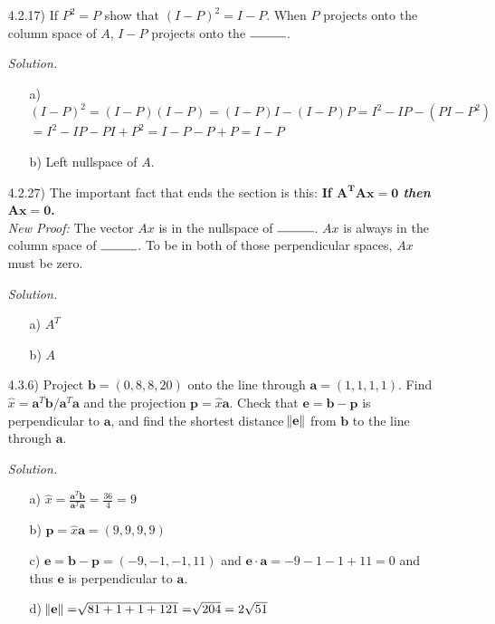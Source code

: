\documentclass[12pt]{article}
\begin{document}
\begin{itemize}
\item[4.2.17)] If $P^2=P$ show that $(I - P)^2=I - P$. When $P$ projects onto the column space of $A$, $I - P$ projects onto the $\rule{1cm}{0.15mm}$.

\textit{Solution.}
\begin{itemize}
\item[a)] $(I-P)^2=(I-P)(I-P)=(I-P)I-(I-P)P=I^2-IP-(PI-P^2)$\\
		  $=I^2-IP-PI+P^2=I-P-P+P=I-P$
\item[b)] Left nullspace of $A$.
\end{itemize}

\item[4.2.27)] The important fact that ends the section is this: \textbf{If $\mathbf{A^TAx=0}$ \textit{then} $\mathbf{Ax=0}$.} \\
\textit{New Proof:} The vector $Ax$ is in the nullspace of $\rule{1cm}{0.15mm}$. $Ax$ is always in the column space of $\rule{1cm}{0.15mm}$. To be in both of those perpendicular spaces, $Ax$ must be zero.

\textit{Solution.}
\begin{itemize}
\item[a)] $A^T$
\item[b)] $A$
\end{itemize}

\item[4.3.6)] Project $\mathbf{b}=(0,8,8,20)$ onto the line through $\mathbf{a}=(1,1,1,1)$. Find $\hat{x}=\mathbf{a}^T\mathbf{b}/\mathbf{a}^T\mathbf{a}$ and the projection $\mathbf{p}=\hat{x}\mathbf{a}$. Check that $\mathbf{e}=\mathbf{b}-\mathbf{p}$ is perpendicular to $\mathbf{a}$, and find the shortest distance $\norm{\mathbf{e}}$ from $\mathbf{b}$ to the line through $\mathbf{a}$.

\textit{Solution.}
\begin{itemize}
\item[a)] $\hat{x}=\frac{\mathbf{a}^T\mathbf{b}}{\mathbf{a}^T\mathbf{a}}=\frac{36}{4}=9$
\item[b)] $\mathbf{p}=\hat{x}\mathbf{a}=(9,9,9,9)$
\item[c)] $\mathbf{e}=\mathbf{b}-\mathbf{p}=(-9,-1,-1,11)$ and $\mathbf{e}\cdot\mathbf{a}=-9-1-1+11=0$ and thus $\mathbf{e}$ is perpendicular to $\mathbf{a}$.
\item[d)] $\norm{\mathbf{e}}=\sqrt[]{81+1+1+121}=\sqrt[]{204}=2\hspace{1mm}\sqrt[]{51}$
\end{itemize}


\end{itemize}
\end{document}
